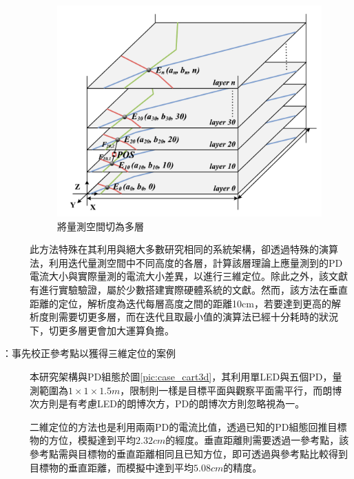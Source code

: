 \begin{description}
        \begin{figure}[htpb]
            \centering
            \includegraphics[width=12cm]{ch2pic/layers_3d.png}
            \caption{\cite{case:3d_layers}將量測空間切為多層}
            \label{pic:layers_3d}
        \end{figure}

        \qquad
        此方法特殊在其利用與絕大多數研究相同的系統架構，卻透過特殊的演算法，利用迭代量測空間中不同高度的各層，計算該層理論上應量測到的PD電流大小與實際量測的電流大小差異，以進行三維定位。除此之外，該文獻有進行實驗驗證，屬於少數搭建實際硬體系統的文獻。然而，該方法在垂直距離的定位，解析度為迭代每層高度之間的距離10cm，若要達到更高的解析度則需要切更多層，而在迭代且取最小值的演算法已經十分耗時的狀況下，切更多層更會加大運算負擔。



        \item[\cite{case:cart3d}：事先校正參考點以獲得三維定位的案例] \hfill 
        
        \qquad
        本研究架構與PD組態於圖\ref{pic:case_cart3d}，其利用單LED與五個PD，量測範圍為$1\times 1\times 1.5m$，限制則一樣是目標平面與觀察平面需平行，而朗博次方則是有考慮LED的朗博次方，PD的朗博次方則忽略視為一。
        
        二維定位的方法也是利用兩兩PD的電流比值，透過已知的PD組態回推目標物的方位，模擬達到平均$2.32cm$的經度。垂直距離則需要透過一參考點，該參考點需與目標物的垂直距離相同且已知方位，即可透過與參考點比較得到目標物的垂直距離，而模擬中達到平均$5.08cm$的精度。


\end{description}
